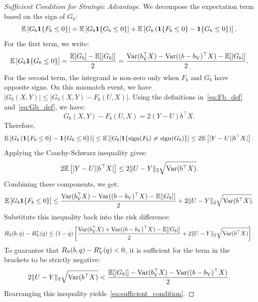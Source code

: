 \begin{proof}[Sufficient Condition for Strategic Advantage]
We decompose the expectation term based on the sign of $G_b$:
\begin{equation}
    \mathbb{E}\left[ G_b \mathbf{1}\{F_b \le 0\} \right] = \mathbb{E}\left[ G_b \mathbf{1}\{G_b \le 0\} \right] + \mathbb{E}\left[ G_b \left( \mathbf{1}\{F_b \le 0\} - \mathbf{1}\{G_b \le 0\} \right) \right].
\end{equation}
For the first term, we write:
\begin{equation}
    \mathbb{E}\left[ G_b \mathbf{1}\{G_b \le 0\} \right] = \frac{\mathbb{E}[G_b] - \mathbb{E}[|G_b|]}{2} = \frac{\mathrm{Var}(b_{\mathrm{V}}^\top X) - \mathrm{Var}((b - b_{\mathrm{V}})^\top X) - \mathbb{E}[|G_b|]}{2}.
\end{equation}
For the second term, the integrand is non-zero only when $F_b$ and $G_b$ have opposite signs. On this mismatch event, we have $|G_b(X, Y)| \le |G_b(X, Y) - F_b(U, X)|$. 
Using the definitions in~\eqref{eq:Fb_def} and~\eqref{eq:Gb_def}, we have:
\begin{equation}
    G_b(X, Y) - F_b(U, X) = 2(Y - U)b^\top X.
\end{equation}
Therefore,
\begin{equation}
    \mathbb{E}\left[ G_b \left( \mathbf{1}\{F_b \le 0\} - \mathbf{1}\{G_b \le 0\} \right) \right] \le \mathbb{E}\left[ |G_b| \mathbf{1}\{\mathrm{sign}(F_b) \ne \mathrm{sign}(G_b)\} \right] \le 2\mathbb{E}\left[ |Y - U||b^\top X| \right].
\end{equation}
Applying the Cauchy-Schwarz inequality gives:
\begin{equation}
    2\mathbb{E}\left[ |Y - U||b^\top X| \right] \le 2 \|U - Y\|_2 \sqrt{\mathrm{Var}(b^\top X)}.
\end{equation}
Combining these components, we get:
\begin{equation}
    \mathbb{E}\left[ G_b \mathbf{1}\{F_b \le 0\} \right] \le \frac{\mathrm{Var}(b_{\mathrm{V}}^\top X) - \mathrm{Var}((b - b_{\mathrm{V}})^\top X) - \mathbb{E}[|G_b|]}{2} + 2 \|U - Y\|_2 \sqrt{\mathrm{Var}(b^\top X)}.
\end{equation}
Substitute this inequality back into the risk difference:
\begin{equation}
    R_{\mathrm{S}}(b, q) - R_{\mathrm{V}}^*(q) \le (1 - q) \left[ \frac{\mathrm{Var}(b_{\mathrm{V}}^\top X) + \mathrm{Var}((b - b_{\mathrm{V}})^\top X) - \mathbb{E}[|G_b|]}{2} + 2\|U - Y\|_2 \sqrt{\mathrm{Var}(b^\top X)} \right].
\end{equation}
To guarantee that $R_{\mathrm{S}}(b, q) - R_{\mathrm{V}}^*(q) < 0$, it is sufficient for the term in the brackets to be strictly negative:
\begin{equation}
    2\|U - Y\|_2 \sqrt{\mathrm{Var}(b^\top X)} < \frac{\mathbb{E}[|G_b|] - \mathrm{Var}(b_{\mathrm{V}}^\top X) - \mathrm{Var}((b - b_{\mathrm{V}})^\top X)}{2}.
\end{equation}
Rearranging this inequality yields~\eqref{eq:sufficient_condition}.
\end{proof}

